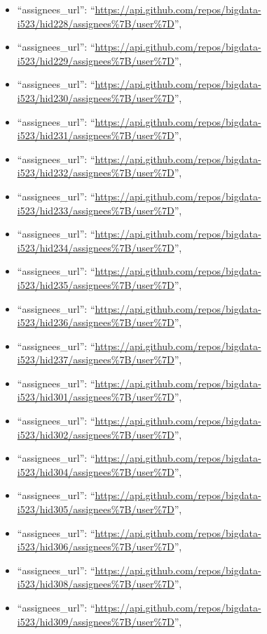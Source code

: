 \begin{itemize}
\item
  ``assignees\_url'':
  ``\url{https://api.github.com/repos/bigdata-i523/hid228/assignees\%7B/user\%7D}'',
\item
  ``assignees\_url'':
  ``\url{https://api.github.com/repos/bigdata-i523/hid229/assignees\%7B/user\%7D}'',
\item
  ``assignees\_url'':
  ``\url{https://api.github.com/repos/bigdata-i523/hid230/assignees\%7B/user\%7D}'',
\item
  ``assignees\_url'':
  ``\url{https://api.github.com/repos/bigdata-i523/hid231/assignees\%7B/user\%7D}'',
\item
  ``assignees\_url'':
  ``\url{https://api.github.com/repos/bigdata-i523/hid232/assignees\%7B/user\%7D}'',
\item
  ``assignees\_url'':
  ``\url{https://api.github.com/repos/bigdata-i523/hid233/assignees\%7B/user\%7D}'',
\item
  ``assignees\_url'':
  ``\url{https://api.github.com/repos/bigdata-i523/hid234/assignees\%7B/user\%7D}'',
\item
  ``assignees\_url'':
  ``\url{https://api.github.com/repos/bigdata-i523/hid235/assignees\%7B/user\%7D}'',
\item
  ``assignees\_url'':
  ``\url{https://api.github.com/repos/bigdata-i523/hid236/assignees\%7B/user\%7D}'',
\item
  ``assignees\_url'':
  ``\url{https://api.github.com/repos/bigdata-i523/hid237/assignees\%7B/user\%7D}'',
\item
  ``assignees\_url'':
  ``\url{https://api.github.com/repos/bigdata-i523/hid301/assignees\%7B/user\%7D}'',
\item
  ``assignees\_url'':
  ``\url{https://api.github.com/repos/bigdata-i523/hid302/assignees\%7B/user\%7D}'',
\item
  ``assignees\_url'':
  ``\url{https://api.github.com/repos/bigdata-i523/hid304/assignees\%7B/user\%7D}'',
\item
  ``assignees\_url'':
  ``\url{https://api.github.com/repos/bigdata-i523/hid305/assignees\%7B/user\%7D}'',
\item
  ``assignees\_url'':
  ``\url{https://api.github.com/repos/bigdata-i523/hid306/assignees\%7B/user\%7D}'',
\item
  ``assignees\_url'':
  ``\url{https://api.github.com/repos/bigdata-i523/hid308/assignees\%7B/user\%7D}'',
\item
  ``assignees\_url'':
  ``\url{https://api.github.com/repos/bigdata-i523/hid309/assignees\%7B/user\%7D}'',

\end{itemize}
